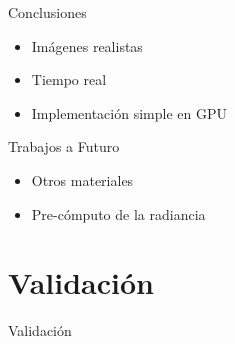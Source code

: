 \documentclass[spanish,unknownkeysallowed]{beamer}
\begin{document}








\begin{frame}{Conclusiones}
\begin{itemize}
\item Imágenes realistas
\item Tiempo real
\item Implementación simple en GPU
\end{itemize}

\begin{block}{Trabajos a Futuro}
\begin{itemize}
\item Otros materiales
\item Pre-cómputo de la radiancia
\end{itemize}
\end{block}
\end{frame}

\section{Validación}



\begin{frame}
\begin{block}{}
\begin{center}
\vspace{1cm}
\huge{Validación}
\vspace{1cm}
\end{center}
\end{block}
\end{frame}
\end{document}
